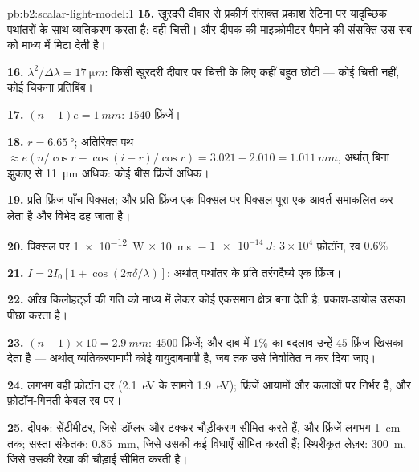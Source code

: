 \begin{solution}{pb:b2:scalar-light-model:1}
\textbf{15.} खुरदरी दीवार से प्रकीर्ण संसक्त प्रकाश रेटिना पर
यादृच्छिक पथांतरों के साथ व्यतिकरण करता है: वही चित्ती। और दीपक की
माइक्रोमीटर-पैमाने की संसक्ति उस सब को माध्य में मिटा देती है।

\textbf{16.} $\lambda^2/\Delta\lambda = \qty{17}{\micro m}$: किसी खुरदरी दीवार पर चित्ती के
लिए कहीं बहुत छोटी --- कोई चित्ती नहीं, कोई चिकना प्रतिबिंब।

\textbf{17.} $(n - 1)e = \qty{1}{mm}$: $1540$ फ्रिंजें।

\textbf{18.} $r = \qty{6.65}{\degree}$; अतिरिक्त पथ $\approx e(n/\cos r - \cos(i - r)/\cos r)
= 3.021 - 2.010 = \qty{1.011}{mm}$, अर्थात् बिना झुकाए से \qty{11}{\micro m} अधिक: कोई
बीस फ्रिंजें अधिक।

\textbf{19.} प्रति फ्रिंज पाँच पिक्सल; और प्रति फ्रिंज एक पिक्सल पर पिक्सल
पूरा एक आवर्त समाकलित कर लेता है और विभेद ढह जाता है।

\textbf{20.} पिक्सल पर \qty{1e-12}{W} $\times$ \qty{10}{ms} $= \qty{1e-14}{J}$: $3 \times 10^4$
फ़ोटॉन, रव $0.6\%$।

\textbf{21.} $I = 2I_0[1 + \cos(2\pi\delta/\lambda)]$: अर्थात् पथांतर के प्रति तरंगदैर्घ्य
एक फ्रिंज।

\textbf{22.} आँख किलोहर्ट्ज़ की गति को माध्य में लेकर कोई एकसमान
क्षेत्र बना देती है; प्रकाश-डायोड उसका पीछा करता है।

\textbf{23.} $(n - 1) \times 10 = \qty{2.9}{mm}$: $4500$ फ्रिंजें; और दाब में $1\%$ का
बदलाव उन्हें $45$ फ्रिंज खिसका देता है --- अर्थात् व्यतिकरणमापी कोई
वायुदाबमापी है, जब तक उसे निर्वातित न कर दिया जाए।

\textbf{24.} लगभग वही फ़ोटॉन दर (\qty{2.1}{eV} के सामने \qty{1.9}{eV});
फ्रिंजें आयामों और कलाओं पर निर्भर हैं, और फ़ोटॉन-गिनती केवल
रव पर।

\textbf{25.} दीपक: सेंटीमीटर, जिसे डॉप्लर और टक्कर-चौड़ीकरण सीमित करते
हैं, और फ्रिंजें लगभग \qty{1}{cm} तक; सस्ता संकेतक: \qty{0.85}{mm},
जिसे उसकी कई विधाएँ सीमित करती हैं; स्थिरीकृत लेज़र: \qty{300}{m}, जिसे
उसकी रेखा की चौड़ाई सीमित करती है।
\end{solution}
